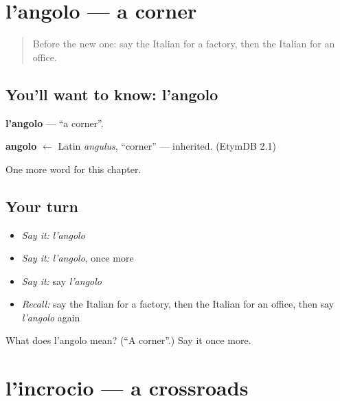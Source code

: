 \section[l'angolo]{l'angolo — a corner}

\label{lesson:IT-C89-angolo}



\begin{quote}
Before the new one: say the Italian for a factory, then the Italian for an office.
\end{quote}

\subsection*{You'll want to know: l'angolo}
\textbf{l'angolo} — \textquotedblleft{}a corner\textquotedblright{}.

\begin{cousinweb}
\textbf{angolo} $\leftarrow$ Latin \emph{angulus}, \textquotedblleft{}corner\textquotedblright{} — inherited. (EtymDB 2.1)
\end{cousinweb}

\begin{grammarlens}[title={What you've built}]
One more word for this chapter.
\end{grammarlens}

\subsection*{Your turn}
\begin{itemize}
\raggedright
  \item \emph{Say it:} \emph{l'angolo}
  \item \emph{Say it:} \emph{l'angolo}, once more
  \item \emph{Say it:} say \emph{l'angolo}
  \item \emph{Recall:} say the Italian for a factory, then the Italian for an office, then say \emph{l'angolo} again
\end{itemize}

\begin{tcolorbox}[breakable,colback=teal!4,colframe=teal!35!black,title={Before you move on}]
What does l'angolo mean? (\textquotedblleft{}A corner\textquotedblright{}.) Say it once more.
\end{tcolorbox}
\section[l'incrocio]{l'incrocio — a crossroads}

